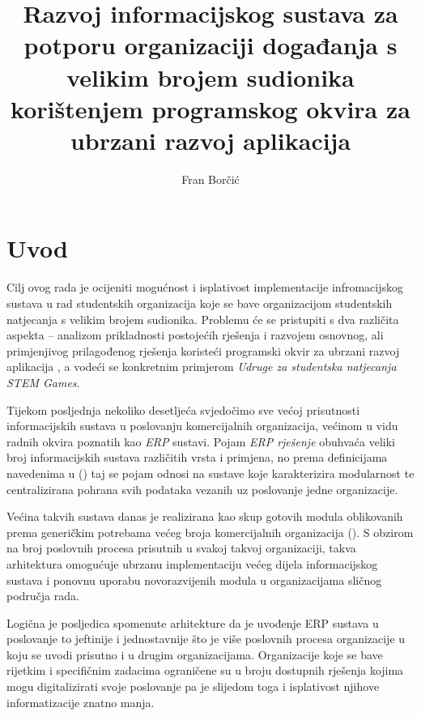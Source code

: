 \documentclass[times, utf8, diplomski]{fer}
\begin{document}

\title{Razvoj informacijskog sustava za potporu organizaciji događanja s velikim
brojem sudionika korištenjem programskog okvira za ubrzani razvoj aplikacija}

\author{Fran Borčić}

\maketitle




\tableofcontents

\chapter{Uvod}

Cilj ovog rada je ocijeniti mogućnost i isplativost implementacije
infromacijskog sustava u rad studentskih organizacija koje se bave organizacijom
studentskih natjecanja s velikim brojem sudionika. Problemu će se pristupiti s
dva različita aspekta -- analizom prikladnosti postojećih rješenja i razvojem
osnovnog, ali primjenjivog prilagođenog rješenja koristeći programski okvir za
ubrzani razvoj aplikacija , a vodeći se konkretnim primjerom
\emph{Udruge za studentska natjecanja STEM Games}.

Tijekom posljednja nekoliko desetljeća svjedočimo sve većoj prisutnosti
informacijskih sustava u poslovanju komercijalnih organizacija, većinom u vidu
radnih okvira poznatih kao \emph{ERP} sustavi. Pojam \emph{ERP rješenje}
 obuhvaća veliki broj informacijskih sustava
različitih vrsta i primjena, no prema definicijama navedenima u
(\cite{evolutionerp})
taj se pojam odnosi na sustave koje karakterizira modularnost te centralizirana
pohrana svih podataka vezanih uz poslovanje jedne organizacije.

Većina takvih sustava danas je realizirana kao skup gotovih modula oblikovanih
prema generičkim potrebama većeg broja komercijalnih organizacija
(\cite{bradford2014modern}). S obzirom na broj poslovnih procesa prisutnih u
svakoj takvoj organizaciji, takva arhitektura omogućuje ubrzanu implementaciju
većeg dijela informacijskog sustava i ponovnu uporabu novorazvijenih modula u
organizacijama sličnog područja rada.

Logična je posljedica spomenute arhitekture da je uvođenje ERP sustava u
poslovanje to jeftinije i jednostavnije što je više poslovnih procesa organizacije
u koju se uvodi prisutno i u drugim organizacijama. Organizacije koje se bave
rijetkim i specifičnim zadacima ograničene su u broju dostupnih rješenja kojima
mogu digitalizirati svoje poslovanje pa je slijedom toga i isplativost njihove
informatizacije znatno manja.
\end{document}
